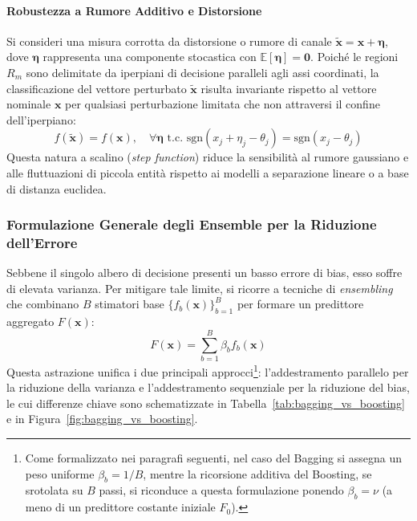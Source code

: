 \paragraph{Robustezza a Rumore Additivo e Distorsione}
Si consideri una misura corrotta da distorsione o rumore di canale $\tilde{\mathbf{x}} = \mathbf{x} + \boldsymbol{\eta}$, dove $\boldsymbol{\eta}$ rappresenta una componente stocastica con $\mathbb{E}[\boldsymbol{\eta}] = \mathbf{0}$. Poiché le regioni $R_m$ sono delimitate da iperpiani di decisione paralleli agli assi coordinati, la classificazione del vettore perturbato $\tilde{\mathbf{x}}$ risulta invariante rispetto al vettore nominale $\mathbf{x}$ per qualsiasi perturbazione limitata che non attraversi il confine dell'iperpiano:
\begin{equation}
    f(\tilde{\mathbf{x}}) = f(\mathbf{x}), \quad \forall \boldsymbol{\eta} \text{ t.c. } \text{sgn}(x_j + \eta_j - \theta_j) = \text{sgn}(x_j - \theta_j)
\end{equation}
Questa natura a scalino (\textit{step function}) riduce la sensibilità al rumore gaussiano e alle fluttuazioni di piccola entità rispetto ai modelli a separazione lineare o a base di distanza euclidea.

\subsubsection{Formulazione Generale degli Ensemble per la Riduzione dell'Errore}
Sebbene il singolo albero di decisione presenti un basso errore di bias, esso soffre di elevata varianza. Per mitigare tale limite, si ricorre a tecniche di \textit{ensembling} che combinano $B$ stimatori base $\{f_b(\mathbf{x})\}_{b=1}^B$ per formare un predittore aggregato $F(\mathbf{x})$:
\begin{equation}
    F(\mathbf{x}) = \sum_{b=1}^B \beta_b f_b(\mathbf{x})
\end{equation}
Questa astrazione unifica i due principali approcci\footnote{Come formalizzato nei paragrafi seguenti, nel caso del Bagging si assegna un peso uniforme $\beta_b = 1/B$, mentre la ricorsione additiva del Boosting, se srotolata su $B$ passi, si riconduce a questa formulazione ponendo $\beta_b = \nu$ (a meno di un predittore costante iniziale $F_0$).}: l'addestramento parallelo per la riduzione della varianza e l'addestramento sequenziale per la riduzione del bias, le cui differenze chiave sono schematizzate in Tabella~\ref{tab:bagging_vs_boosting} e in Figura~\ref{fig:bagging_vs_boosting}.

